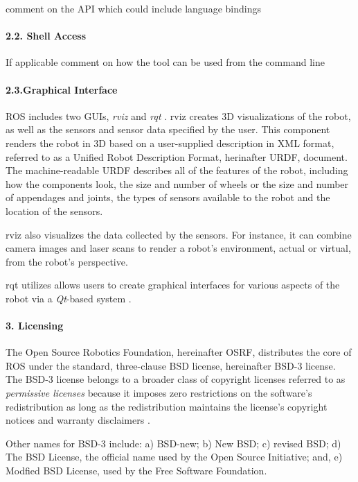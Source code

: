 \documentclass[9pt,twocolumn,twoside]{styles/osajnl}
\begin{document}
comment on the API which could include language bindings

\paragraph{2.2. Shell Access}

If applicable comment on how the tool can be used from the command line

\paragraph{2.3.Graphical Interface}

ROS includes two GUIs, \textit{rviz} and \textit{rqt} \cite{www-ros-core-components}.  rviz creates 3D visualizations of the robot, as well as the sensors and sensor data specified by the user.  This component renders the robot in 3D based on a user-supplied description in XML format, referred to as a Unified Robot Description Format, herinafter URDF, document.  The machine-readable URDF describes all of the features of the robot, including how the components look, the size and number of wheels or the size and number of appendages and joints, the types of sensors available to the robot and the location of the sensors.

rviz also visualizes the data collected by the sensors.  For instance, it can combine camera images and laser scans to render a robot's environment, actual or virtual, from the robot's perspective.  

rqt utilizes allows users to create graphical interfaces for various aspects of the robot via a \textit{Qt}-based system \cite{www-wiki-qt}.



\paragraph{3. Licensing}

The Open Source Robotics Foundation, hereinafter OSRF, distributes the core of ROS under the standard, three-clause BSD license, hereinafter BSD-3 license.  The BSD-3 license belongs to a broader class of copyright licenses referred to as \textit{permissive licenses} because it imposes zero restrictions on the software's redistribution as long as the redistribution maintains the license's copyright notices and warranty disclaimers \cite{www-wikipedia-bsd}.

Other names for BSD-3 include: a) BSD-new; b) New BSD; c) revised BSD; d) The BSD License, the official name used by the Open Source Initiative; and, e) Modfied BSD License, used by the Free Software Foundation.
\end{document}
